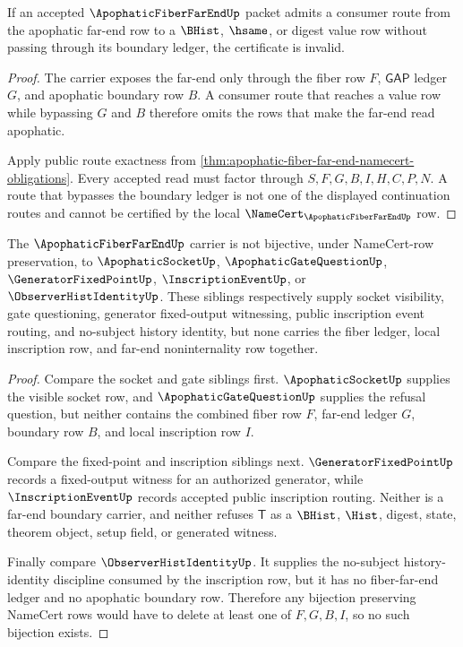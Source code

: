 \begin{theorem}
\label{thm:apophatic-fiber-far-end-falsifiable-prediction}
If an accepted $\ApophaticFiberFarEndUp$ packet admits a consumer route from the apophatic far-end row to a $\BHist$, $\hsame$, or digest value row without passing through its boundary ledger, the certificate is invalid.
\end{theorem}
\begin{proof}
The carrier exposes the far-end only through the fiber row $F$, $\mathsf{GAP}$ ledger $G$, and apophatic boundary row $B$. A consumer route that reaches a value row while bypassing $G$ and $B$ therefore omits the rows that make the far-end read apophatic.

Apply public route exactness from \autoref{thm:apophatic-fiber-far-end-namecert-obligations}. Every accepted read must factor through $S,F,G,B,I,H,C,P,N$. A route that bypasses the boundary ledger is not one of the displayed continuation routes and cannot be certified by the local $\NameCert_{\ApophaticFiberFarEndUp}$ row.
\end{proof}

\begin{theorem}
\label{thm:apophatic-fiber-far-end-independence-witness}
The $\ApophaticFiberFarEndUp$ carrier is not bijective, under NameCert-row preservation, to $\ApophaticSocketUp$, $\ApophaticGateQuestionUp$, $\GeneratorFixedPointUp$, $\InscriptionEventUp$, or $\ObserverHistIdentityUp$. These siblings respectively supply socket visibility, gate questioning, generator fixed-output witnessing, public inscription event routing, and no-subject history identity, but none carries the fiber ledger, local inscription row, and far-end noninternality row together.
\end{theorem}
\begin{proof}
Compare the socket and gate siblings first. $\ApophaticSocketUp$ supplies the visible socket row, and $\ApophaticGateQuestionUp$ supplies the refusal question, but neither contains the combined fiber row $F$, far-end ledger $G$, boundary row $B$, and local inscription row $I$.

Compare the fixed-point and inscription siblings next. $\GeneratorFixedPointUp$ records a fixed-output witness for an authorized generator, while $\InscriptionEventUp$ records accepted public inscription routing. Neither is a far-end boundary carrier, and neither refuses $\mathsf{T}$ as a $\BHist$, $\Hist$, digest, state, theorem object, setup field, or generated witness.

Finally compare $\ObserverHistIdentityUp$. It supplies the no-subject history-identity discipline consumed by the inscription row, but it has no fiber-far-end ledger and no apophatic boundary row. Therefore any bijection preserving NameCert rows would have to delete at least one of $F,G,B,I$, so no such bijection exists.
\end{proof}

